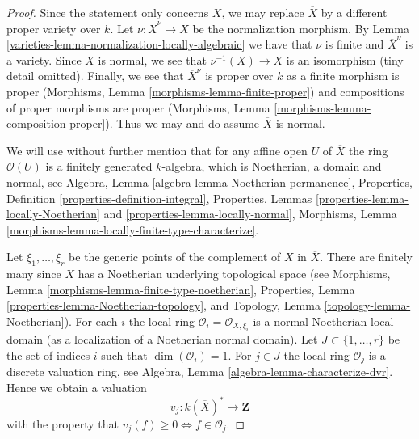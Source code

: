 \begin{proof}

Since the statement only concerns $X$, we may replace $\overline{X}$
by a different proper variety over $k$. Let $\nu : \overline{X}^\nu \to
\overline{X}$ be the normalization morphism. By
Lemma \ref{varieties-lemma-normalization-locally-algebraic}
we have that $\nu$ is finite and $\overline{X}^\nu$ is a
variety. Since $X$ is normal, we see that $\nu^{-1}(X) \to X$ is an
isomorphism (tiny detail omitted). Finally, we see that
$\overline{X}^\nu$ is proper over $k$ as a finite morphism is proper
(Morphisms, Lemma \ref{morphisms-lemma-finite-proper})
and compositions of proper morphisms
are proper (Morphisms, Lemma \ref{morphisms-lemma-composition-proper}).
Thus we may and do assume $\overline{X}$ is normal.

\medskip\noindent
We will use without further mention that for any affine open $U$ of
$\overline{X}$ the ring $\mathcal{O}(U)$ is a finitely generated
$k$-algebra, which is Noetherian, a domain and normal, see
Algebra, Lemma \ref{algebra-lemma-Noetherian-permanence},
Properties, Definition \ref{properties-definition-integral},
Properties, Lemmas \ref{properties-lemma-locally-Noetherian} and
\ref{properties-lemma-locally-normal},
Morphisms, Lemma \ref{morphisms-lemma-locally-finite-type-characterize}.

\medskip\noindent
Let $\xi_1, \ldots, \xi_r$ be the generic points of the complement of $X$
in $\overline{X}$. There are finitely many since $\overline{X}$ has a
Noetherian underlying topological space (see
Morphisms, Lemma \ref{morphisms-lemma-finite-type-noetherian},
Properties, Lemma \ref{properties-lemma-Noetherian-topology}, and
Topology, Lemma \ref{topology-lemma-Noetherian}).
For each $i$ the local ring $\mathcal{O}_i = \mathcal{O}_{X, \xi_i}$
is a normal Noetherian local domain (as a localization of a
Noetherian normal domain). Let $J \subset \{1, \ldots, r\}$ be the set of
indices $i$ such that $\dim(\mathcal{O}_i) = 1$. For $j \in J$ the
local ring $\mathcal{O}_j$ is a discrete valuation ring, see
Algebra, Lemma \ref{algebra-lemma-characterize-dvr}.
Hence we obtain a valuation
$$
v_j : k(\overline{X})^* \longrightarrow \mathbf{Z}
$$
with the property that $v_j(f) \geq 0 \Leftrightarrow f \in \mathcal{O}_j$.


\end{proof}
